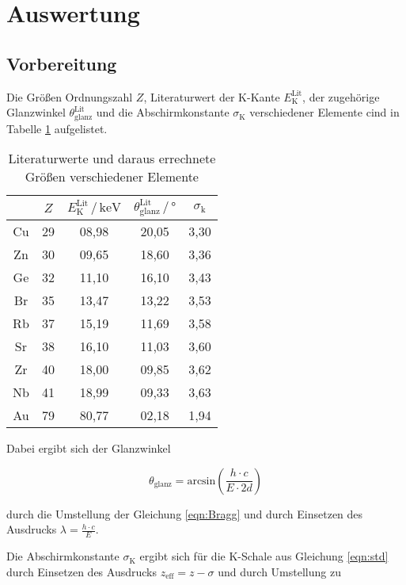 \section{Auswertung}
\label{sec:Auswertung}

\subsection{Vorbereitung}

Die Größen Ordnungszahl $Z$, Literaturwert der
K-Kante $E_\text{K}^\text{Lit}$, der zugehörige Glanzwinkel 
$\theta_\text{glanz}^\text{Lit}$ und die Abschirmkonstante 
$\sigma_\text{K}$ verschiedener Elemente cind in Tabelle 
\ref{tab:literatur} aufgelistet.

\begin{table}
  \centering
  \caption{Literaturwerte und daraus errechnete Größen verschiedener Elemente}
  \label{tab:literatur}
  \begin{tabular}{c c c c c}
  \toprule
  $ $ & $Z$ & $E_\text{K}^\text{Lit} \,/\, \si{\kilo\eV}$
  & $\theta_\text{glanz}^\text{Lit} \,/\, \si{\degree}$ & 
  $\sigma_\text{k}$\\
  \midrule 
  Cu & 29 & 08,98 & 20,05 & 3,30 \\
  Zn & 30 & 09,65 & 18,60 & 3,36 \\
  Ge & 32 & 11,10 & 16,10 & 3,43 \\
  Br & 35 & 13,47 & 13,22 & 3,53 \\
  Rb & 37 & 15,19 & 11,69 & 3,58 \\
  Sr & 38 & 16,10 & 11,03 & 3,60 \\
  Zr & 40 & 18,00 & 09,85 & 3,62 \\
  Nb & 41 & 18,99 & 09,33 & 3,63 \\
  Au & 79 & 80,77 & 02,18 & 1,94 \\
  \bottomrule
  \end{tabular}
  \end{table}

Dabei ergibt sich der Glanzwinkel

  \begin{equation}
    \theta_\text{glanz} = \text{arcsin}\left(\frac{h \cdot c}{E \cdot 2d}\right)
    \label{eqn:theta}
  \end{equation}

  durch die Umstellung der Gleichung \eqref{eqn:Bragg} und durch Einsetzen 
  des Ausdrucks $\lambda = \frac{h \cdot c}{E}$.

  Die Abschirmkonstante $\sigma_\text{K}$ ergibt sich für die K-Schale aus Gleichung
  \eqref{eqn:std} durch Einsetzen des Ausdrucks $z_\text{eff} = z -\sigma$ und durch 
  Umstellung zu 

